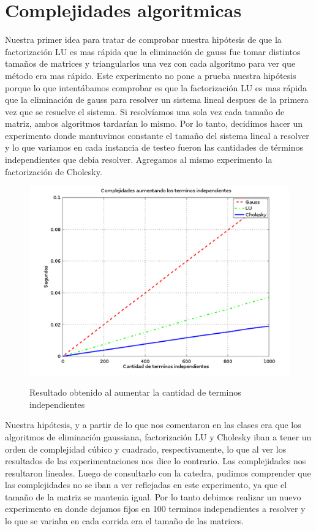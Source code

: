 \section{Complejidades algoritmicas}

\indent Nuestra primer idea para tratar de comprobar nuestra hipótesis de que la factorización LU es mas rápida que la eliminación de gauss fue tomar distintos tamaños de matrices y triangularlos una vez con cada algoritmo para ver que método era mas rápido. Este experimento no pone a prueba nuestra hipótesis porque lo que intentábamos comprobar es que la factorización LU es mas rápida que la eliminación de gauss para resolver un sistema lineal despues de la primera vez que se resuelve el sistema. Si resolvíamos una sola vez cada tamaño de matriz, ambos algoritmos tardarían lo mismo. Por lo tanto, decidimos hacer un experimento donde mantuvimos constante el tamaño del sistema lineal a resolver y lo que variamos en cada instancia de testeo fueron las cantidades de términos independientes que debia resolver. Agregamos al mismo experimento la factorización de Cholesky.

\begin{figure}[h]
   \includegraphics[scale=0.5]{ComplejidadesMalas.png}
   \label{Fig. 6}
   \caption{Resultado obtenido al aumentar la cantidad de terminos independientes}
\end{figure}

\indent Nuestra hipótesis, y a partir de lo que nos comentaron en las clases era que los algoritmos de eliminación gaussiana, factorización LU y Cholesky iban a tener un orden de complejidad cúbico y cuadrado, respectivamente, lo que al ver los resultados de las experimentaciones nos dice lo contrario. Las complejidades nos resultaron lineales.
Luego de consultarlo con la catedra, pudimos comprender que las complejidades no se iban a ver reflejadas en este experimento, ya que el tamaño de la matriz se mantenia igual. Por lo tanto debimos realizar un nuevo experimento en donde dejamos fijos en 100 terminos independientes a resolver y lo que se variaba en cada corrida era el tamaño de las matrices.


